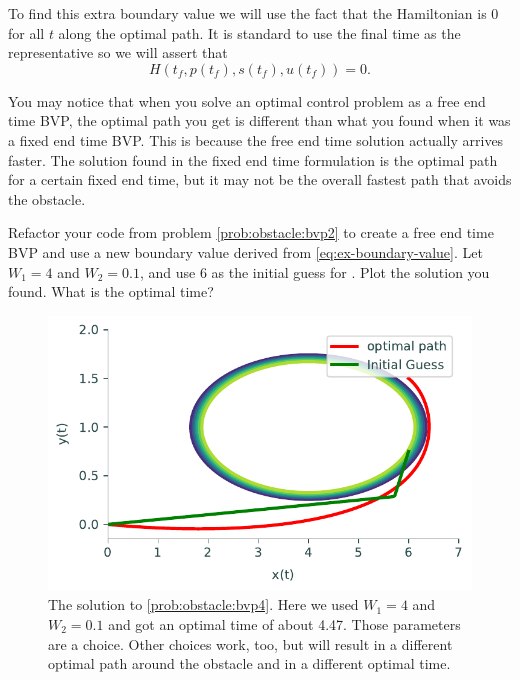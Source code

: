 To find this extra boundary value we will use the fact that the Hamiltonian is 0 for all $t$ along the optimal path. It is standard to use the final time as the representative so we will assert that
\begin{equation}\label{eq:ex-boundary-value}
    H(t_f,p(t_f),s(t_f),u(t_f)) = 0.
\end{equation}

You may notice that when you solve an optimal control problem as a free end time BVP, the optimal path you get is different than what you found when it was a fixed end time BVP.
This is because the free end time solution actually arrives faster.
The solution found in the fixed end time formulation is the optimal path for a certain fixed end time, but it may not be the overall fastest path that avoids the obstacle.

\begin{problem}
\label{prob:obstacle:bvp4}
Refactor your code from problem \ref{prob:obstacle:bvp2} to create a free end time BVP and use a new boundary value derived from \ref{eq:ex-boundary-value}. Let $W_1 = 4$ and $W_2 = 0.1$, and use $6$ as the initial guess for .
Plot the solution you found.
What is the optimal time?
\end{problem}

\begin{figure}[H]
    \centering
    \includegraphics[width=\textwidth]{figures/OA_prob4.pdf}
    \caption{The solution to \ref{prob:obstacle:bvp4}.  Here we used $W_1 = 4$ and $W_2 = 0.1$ and got an optimal time of about 4.47.  Those parameters are a choice.  Other choices work, too, but will result in a different optimal path around the obstacle and in a different optimal time.}
\end{figure}
